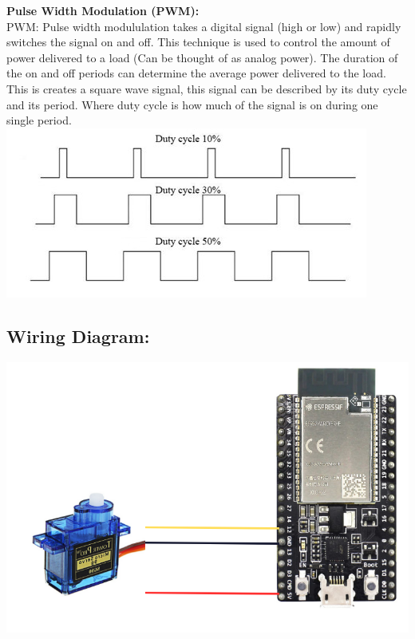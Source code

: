 \documentclass[a4paper,12pt]{report}
\newcommand{\diagramWidth}{150mm}
\begin{document}
        \begin{mdframed}[linewidth = 3, linecolor = turbo_purple]
            \textbf{Pulse Width Modulation (PWM):}
            \\
            PWM: Pulse width modululation takes a digital signal (high or low) and rapidly switches the signal 
            on and off. This technique is used to control the amount of power delivered to a load 
            (Can be thought of as analog power). The duration of the on and off periods can determine 
            the average power delivered to the load. This is creates a square wave signal, this 
            signal can be described by its duty cycle and its period.  Where duty cycle is how 
            much of the signal is on during one single period. 
            \\
            \includegraphics[scale = 1]{Assets/pwm1.jpg}
        \end{mdframed}
    \subsection*{Wiring Diagram:}
        \includegraphics[width = \diagramWidth]{Assets/servoWiring.png}
    \newpage
\end{document}
